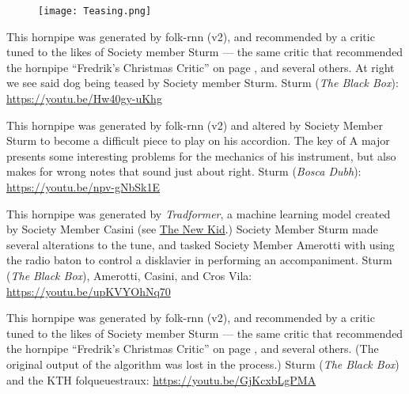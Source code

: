 \documentclass[a4paper,notitlepage,twoside]{book}
\begin{document}
{}  
  
\hypertarget{hornpipe:TeasetheDog}{}
\begin{figure}
\texttt{[image: Teasing.png]}
\end{figure}
This hornpipe was generated by folk-rnn (v2), 
and recommended by a critic tuned to the likes of 
Society member Sturm --- the same critic that recommended
the hornpipe ``Fredrik's Christmas Critic'' on page \pageref{hornpipe:FredriksChristmasCritic},
and several others.
At right we see said dog being teased by Society member Sturm.
Sturm ({\em The Black Box}): \url{https://youtu.be/Hw40gy-uKhg}

\clearpage
{}
{}  
  
\hypertarget{hornpipe:DogintheBog}{}
This hornpipe was generated by folk-rnn (v2) and
altered by Society Member Sturm to become a difficult piece to play
on his accordion.
The key of A major presents some interesting problems for the mechanics
of his instrument, but also makes for wrong notes that sound just about right.
Sturm ({\em Bosca Dubh}): \url{https://youtu.be/npv-gNbSk1E}

\clearpage
{}
{}  
  
\hypertarget{hornpipe:RadioBatonHornpipe}{}
This hornpipe was generated by {\em Tradformer}, 
a machine learning model created by Society Member Casini
(see \hyperlink{jig:NewKid}{The New Kid}.)
Society Member Sturm made several alterations to the tune,
and tasked Society Member Amerotti with using the radio baton
to control a disklavier in performing an accompaniment.
Sturm ({\em The Black Box}), Amerotti, Casini, and Cros Vila: \url{https://youtu.be/upKVYOhNq70}

{}  
  
\hypertarget{hornpipe:TidforJul}{}
This hornpipe was generated by folk-rnn (v2), 
and recommended by a critic tuned to the likes of 
Society member Sturm --- the same critic that recommended
the hornpipe ``Fredrik's Christmas Critic'' on page \pageref{hornpipe:FredriksChristmasCritic},
and several others.
(The original output of the algorithm was lost in the process.)
Sturm ({\em The Black Box}) and the KTH folqueuestraux: \url{https://youtu.be/GjKcxbLgPMA}
\end{document}
